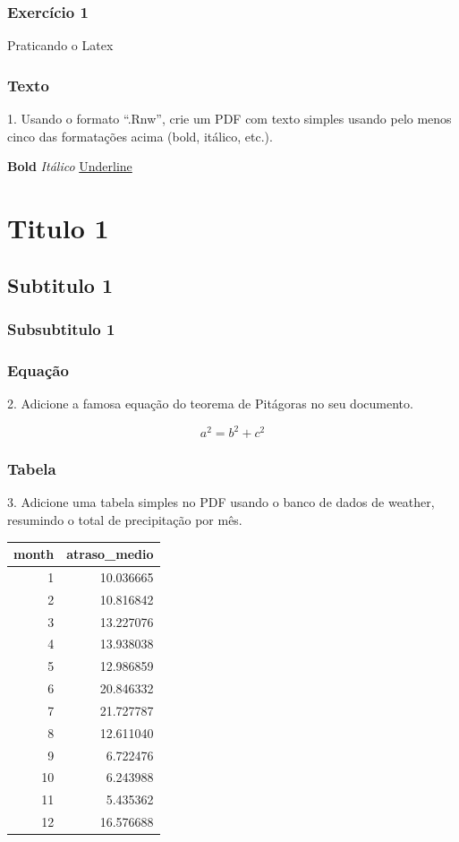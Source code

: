 \documentclass{beamer}\usepackage[]{graphicx}\usepackage[]{xcolor}
\begin{document}
\begin{frame}
\frametitle{Exercício 1}
Praticando o Latex
\end{frame}

\begin{frame}
\frametitle{Texto}
1. Usando o formato “.Rnw”, crie um PDF com texto simples usando pelo menos cinco das formatações acima (bold, itálico, etc.).

\textbf{Bold} 
\textit{Itálico}
\underline{Underline}
\section{Titulo 1}
\subsection{Subtitulo 1}
\subsubsection{Subsubtitulo 1}
\end{frame}

\begin{frame}
\frametitle{Equação}
2. Adicione a famosa equação do teorema de Pitágoras no seu documento.

\begin{equation}
a^2 = b^2 + c^2
\end{equation}
\end{frame}

\begin{frame}[fragile]
\frametitle{Tabela}
3. Adicione uma tabela simples no PDF usando o banco de dados de weather, resumindo o total de precipitação por mês.


\begin{tabular}{r|r}
\hline
month & atraso\_medio\\
\hline
1 & 10.036665\\
\hline
2 & 10.816842\\
\hline
3 & 13.227076\\
\hline
4 & 13.938038\\
\hline
5 & 12.986859\\
\hline
6 & 20.846332\\
\hline
7 & 21.727787\\
\hline
8 & 12.611040\\
\hline
9 & 6.722476\\
\hline
10 & 6.243988\\
\hline
11 & 5.435362\\
\hline
12 & 16.576688\\
\hline
\end{tabular}


\end{frame}
\end{document}
